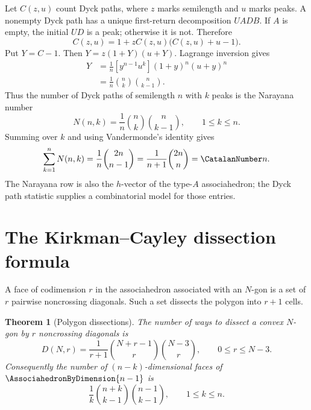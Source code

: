 \documentclass[11pt,a4paper,oneside,openany]{book}
\newtheorem{theorem}{Theorem}[chapter]
\theoremstyle{definition}
\theoremstyle{remark}
\begin{document}
Let $C(z,u)$ count Dyck paths, where $z$ marks semilength and $u$ marks peaks.
A nonempty Dyck path has a unique first-return decomposition $UADB$.  If $A$ is
empty, the initial $UD$ is a peak; otherwise it is not.  Therefore
\begin{equation}
 C(z,u)=1+zC(z,u)\bigl(C(z,u)+u-1\bigr).
 \label{new:eq:dyck-bivariate}
\end{equation}
Put $Y=C-1$.  Then $Y=z(1+Y)(u+Y)$.  Lagrange inversion gives
\begin{align*}
 [z^nu^k]Y
 &=\frac1n[y^{n-1}u^k](1+y)^n(u+y)^n\\
 &=\frac1n\binom nk\binom n{k-1}.
\end{align*}
Thus the number of Dyck paths of semilength $n$ with $k$ peaks is the Narayana
number
\begin{equation}
 N(n,k)=\frac1n\binom nk\binom n{k-1},
 \qquad 1\le k\le n.
 \label{new:eq:narayana}
\end{equation}
Summing over $k$ and using Vandermonde's identity gives
\[
 \sum_{k=1}^nN(n,k)
 =\frac1n\binom{2n}{n-1}
 =\frac1{n+1}\binom{2n}{n}=\CatalanNumber n.
\]
The Narayana row is also the $h$-vector of the type-$A$ associahedron; the Dyck
path statistic supplies a combinatorial model for those entries.

\section{The Kirkman--Cayley dissection formula}

A face of codimension $r$ in the associahedron associated with an $N$-gon is a
set of $r$ pairwise noncrossing diagonals.  Such a set dissects the polygon into
$r+1$ cells.

\begin{theorem}[Polygon dissections]
The number of ways to dissect a convex $N$-gon by $r$ noncrossing diagonals is
\begin{equation}
 D(N,r)=\frac1{r+1}\binom{N+r-1}{r}\binom{N-3}{r},
 \qquad 0\le r\le N-3.
 \label{new:eq:kirkman-cayley}
\end{equation}
Consequently the number of $(n-k)$-dimensional faces of
$\AssociahedronByDimension{n-1}$ is
\begin{equation}
 \frac1k\binom{n+k}{k-1}\binom{n-1}{k-1},
 \qquad 1\le k\le n.
 \label{new:eq:associa-face}
\end{equation}
\end{theorem}
\end{document}
